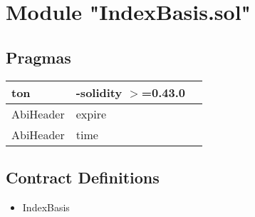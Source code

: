 
\section{Module "IndexBasis.sol"}


\subsection{Pragmas}


\noindent\begin{tabular}{|l|l|p{5cm}|}\hline
ton & -solidity $>$=0.43.0 &\\\hline
AbiHeader &  expire &\\\hline
AbiHeader &  time &\\\hline
\end{tabular}


\subsection{Contract Definitions}

\begin{itemize}
\item IndexBasis
\end{itemize}
